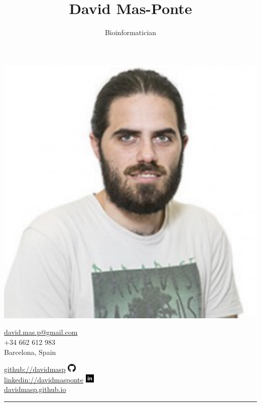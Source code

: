 \documentclass[10pt,a4paper]{article} %
\title{\bfseries\Huge David Mas-Ponte}
\author{Bioinformatician}
\date{}
\begin{document}
\begin{minipage}[c]{0.65\textwidth}
\maketitle
\end{minipage}
\begin{minipage}[c]{0.3\textwidth}
  \includegraphics[width=.55\textwidth]{profile}
\end{minipage}


\begin{minipage}[c]{0.65\textwidth}
  \begin{center}
    \href{mailto:david.mas.p@gmail.com}{david.mas.p@gmail.com}\\
    +34 662 612 983\\
    Barcelona, Spain
  \end{center}
\end{minipage}
\begin{minipage}[c]{0.3\textwidth}
\href{https://github.com/davidmasp}{github://davidmasp}
\includegraphics[height=12pt]{gh}\\
\href{https://www.linkedin.com/in/davidmasponte/}{linkedin://davidmasponte}
\includegraphics[height=12pt]{in}\\
\href{https://davidmasp.github.io}{davidmasp.github.io}
\end{minipage}


\vspace{0.75cm}
\rule{.95\textwidth}{0.6pt}
\end{document}
